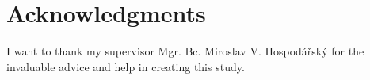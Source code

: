 ﻿\vfill

\section*{Acknowledgments}
I want to thank my supervisor Mgr. Bc. Miroslav V. Hospodářský for the invaluable advice and help in creating this study.

\vglue 2cm $ $


